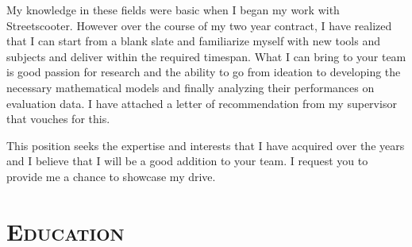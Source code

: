 \documentclass[11pt,a4paper,roman]{moderncv} %
\begin{document}
My knowledge in these fields were basic when I began my work with Streetscooter. However over the course of my two year contract, 
I have realized that I can start from a blank slate and familiarize myself with new tools and subjects and deliver within the required timespan. What I can bring to your team is good passion for research and the ability to go from ideation to developing the necessary mathematical models 
and finally analyzing their performances on evaluation data. I have attached a letter of recommendation from my supervisor that vouches for this.

This position seeks the expertise and interests that I have acquired over the years and I believe that I will be a good addition to your team. 
I request you to provide me a chance to showcase my drive.

\vspace{20pt}
\makeletterclosing %





\newpage

%

\makecvtitle %


\section{\scshape{\huge Education}}

\vspace{10pt}
\end{document}
